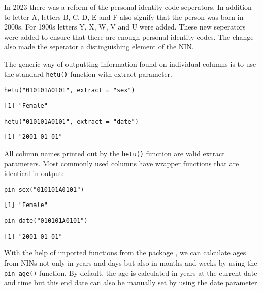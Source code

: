 In 2023 there was a reform of the personal identity code seperators. In addition to letter A, letters B, C, D, E and F also signify that the person was born in 2000s. For 1900s letters Y, X, W, V and U were added. These new seperators were added to ensure that there are enough personal identity codes. The change also made the seperator a distinguishing element of the NIN. \citep{hetureform}

The generic way of outputting information found on individual columns is to use the standard \texttt{hetu()} function with extract-parameter.

\begin{verbatim}
hetu("010101A0101", extract = "sex")
\end{verbatim}

\begin{verbatim}
[1] "Female"
\end{verbatim}

\begin{verbatim}
hetu("010101A0101", extract = "date")
\end{verbatim}

\begin{verbatim}
[1] "2001-01-01"
\end{verbatim}

All column names printed out by the \texttt{hetu()} function are valid extract parameters. Most commonly used columns have wrapper functions that are identical in output:

\begin{verbatim}
pin_sex("010101A0101")
\end{verbatim}

\begin{verbatim}
[1] "Female"
\end{verbatim}

\begin{verbatim}
pin_date("010101A0101")
\end{verbatim}

\begin{verbatim}
[1] "2001-01-01"
\end{verbatim}

With the help of imported functions from the  package \citep{lubridate}, we can calculate ages from NINs not only in years and days but also in months and weeks by using the \texttt{pin\_age()} function. By default, the age is calculated in years at the current date and time but this end date can also be manually set by using the date parameter.

